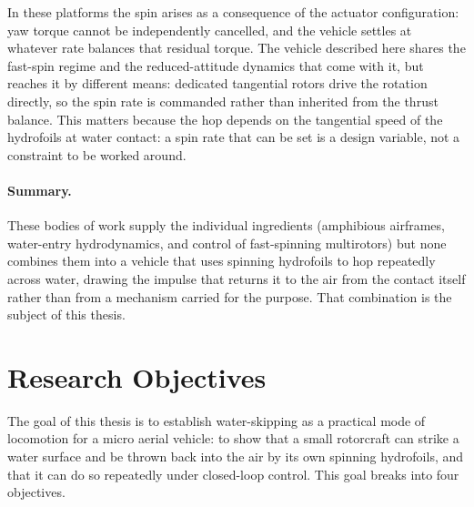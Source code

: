In these platforms the
spin arises as a consequence of the actuator configuration: yaw torque cannot
be independently cancelled, and the vehicle settles at whatever rate balances
that residual torque.  The vehicle described here shares the fast-spin regime
and the reduced-attitude dynamics that come with it, but reaches it by different means: dedicated tangential rotors drive the rotation directly, so
the spin rate is commanded rather than inherited from the thrust balance.  This
matters because the hop depends on the tangential speed of the hydrofoils at
water contact: a spin rate that can be set is a design variable, not a
constraint to be worked around.

\paragraph{Summary.}
These bodies of work supply the individual ingredients (amphibious airframes, water-entry hydrodynamics, and control of fast-spinning multirotors) but none
combines them into a vehicle that uses spinning hydrofoils to hop repeatedly
across water, drawing the impulse that returns it to the air from the contact
itself rather than from a mechanism carried for the purpose.  That combination
is the subject of this thesis.

\section{Research Objectives}
\label{sec:research_objectives}

The goal of this thesis is to establish water-skipping as a practical mode of
locomotion for a micro aerial vehicle: to show that a small rotorcraft can
strike a water surface and be thrown back into the air by its own spinning
hydrofoils, and that it can do so repeatedly under closed-loop control.  This
goal breaks into four objectives.

